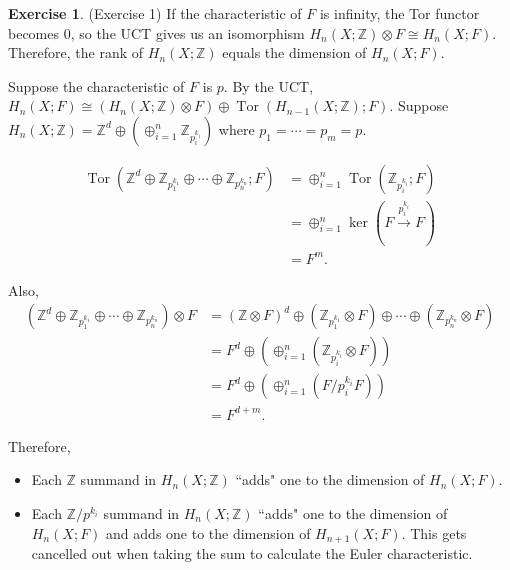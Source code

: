 \documentclass[12pt, psamsfonts]{amsart}
\theoremstyle{definition}
\newtheorem*{exer}{Exercise}
\theoremstyle{remark}
\DeclareMathOperator{\Tor}{Tor}
\numberwithin{equation}{section}
\begin{document}
\begin{exer}{(Exercise 1)}
  If the characteristic of $F$ is infinity, the Tor functor becomes 0, so the UCT gives us an isomorphism $H_n(X; \mathbb{Z}) \otimes F \cong H_n(X; F)$.
  Therefore, the rank of $H_n(X; \mathbb{Z})$ equals the dimension of $H_n(X; F)$.

  Suppose the characteristic of $F$ is $p$.
  By the UCT, $H_n(X; F) \cong (H_n(X; \mathbb{Z}) \otimes F) \oplus \Tor(H_{n - 1}(X; \mathbb{Z}); F)$.
  Suppose $H_n(X; \mathbb{Z}) = \mathbb{Z}^d \oplus (\oplus_{i=1}^{n} \mathbb{Z}_{p_i^{k_i}})$ where $p_1 = \cdots = p_m = p$.

  \begin{align*}
    \Tor(\mathbb{Z}^d \oplus \mathbb{Z}_{p_1^{k_1}} \oplus \cdots \oplus \mathbb{Z}_{p_n^{k_n}}; F)
      &= \oplus_{i=1}^{n} \Tor(\mathbb{Z}_{p_i^{k_i}}; F) \\
      &= \oplus_{i=1}^{n} \ker(F \xrightarrow{p_i^{k_i}} F) \\
      &= F^m.
  \end{align*}

  Also,
  \begin{align*}
    (\mathbb{Z}^d \oplus \mathbb{Z}_{p_1^{k_1}} \oplus \cdots \oplus \mathbb{Z}_{p_n^{k_n}}) \otimes F
      &= (\mathbb{Z} \otimes F)^d \oplus (\mathbb{Z}_{p_1^{k_1}} \otimes F) \oplus \cdots \oplus (\mathbb{Z}_{p_n^{k_n}} \otimes F) \\
      &= F^d \oplus (\oplus_{i=1}^{n} (\mathbb{Z}_{p_i^{k_i}} \otimes F)) \\
      &= F^d \oplus (\oplus_{i=1}^{n} (F / p_i^{k_i}F)) \\
      &= F^{d + m}.
  \end{align*}

  Therefore,
  \begin{itemize}
    \item
      Each $\mathbb{Z}$ summand in $H_n(X; \mathbb{Z})$ ``adds" one to the dimension of $H_n(X; F)$.
    \item
      Each $\mathbb{Z} / p^{k_i}$ summand in $H_n(X; \mathbb{Z})$ ``adds" one to the dimension of $H_n(X; F)$ and adds one to the dimension of $H_{n + 1}(X; F)$.
      This gets cancelled out when taking the sum to calculate the Euler characteristic.
  \end{itemize}
\end{exer}
\end{document}
